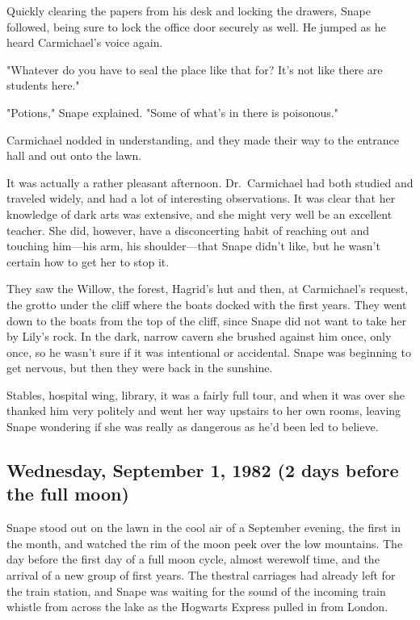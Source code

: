 Quickly clearing the papers from his desk and locking the drawers, Snape followed, being sure to lock the office door securely as well. He jumped as he heard Carmichael's voice again.

"Whatever do you have to seal the place like that for? It's not like there are students here."

"Potions," Snape explained. "Some of what's in there is poisonous."

Carmichael nodded in understanding, and they made their way to the entrance hall and out onto the lawn.

It was actually a rather pleasant afternoon. Dr.~Carmichael had both studied and traveled widely, and had a lot of interesting observations. It was clear that her knowledge of dark arts was extensive, and she might very well be an excellent teacher. She did, however, have a disconcerting habit of reaching out and touching him—his arm, his shoulder—that Snape didn't like, but he wasn't certain how to get her to stop it.

They saw the Willow, the forest, Hagrid's hut and then, at Carmichael's request, the grotto under the cliff where the boats docked with the first years. They went down to the boats from the top of the cliff, since Snape did not want to take her by Lily's rock. In the dark, narrow cavern she brushed against him once, only once, so he wasn't sure if it was intentional or accidental. Snape was beginning to get nervous, but then they were back in the sunshine.

Stables, hospital wing, library, it was a fairly full tour, and when it was over she thanked him very politely and went her way upstairs to her own rooms, leaving Snape wondering if she was really as dangerous as he'd been led to believe.

\subsection{Wednesday, September 1, 1982 (2 days before the full moon)}

Snape stood out on the lawn in the cool air of a September evening, the first in the month, and watched the rim of the moon peek over the low mountains. The day before the first day of a full moon cycle, almost werewolf time, and the arrival of a new group of first years. The thestral carriages had already left for the train station, and Snape was waiting for the sound of the incoming train whistle from across the lake as the Hogwarts Express pulled in from London.

